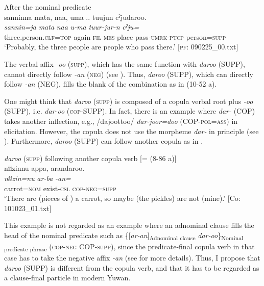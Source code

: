  \ex After the nominal predicate\\
      \glll    {\textbar}sannin{\textbar}na  mata,  naa,  uma ..  tuujun  cˀjudaroo.\\
    \textit{sannin=ja}  \textit{mata}  \textit{naa}  \textit{u-ma}  \textit{tuur-jur-n} \textit{cˀju=}\\
    three.person.\textsc{clf}=\textsc{top}  again  \textsc{fil}  \textsc{mes}-place  pass-\textsc{umrk}-\textsc{ptcp}  person=\textsc{supp}  \\
    \glt     ‘Probably, the three people are people who pass there.’   [\textsc{pf}: 090225\_00.txt]
\z
\z

The verbal affix \textit{{}-oo} (\textsc{supp}), which has the same function with \textit{daroo} (SUPP), cannot directly follow \textit{{}-an} (\textsc{neg}) (see ). Thus, \textit{daroo} (SUPP), which can directly follow \textit{-an} (NEG), fills the blank of the combination as in (10-52 a).

  One might think that \textit{daroo} (\textsc{supp}) is composed of a copula verbal root plus \textit{{}-oo} (SUPP), i.e. \textit{dar-oo} (\textsc{cop}-SUPP). In fact, there is an example where \textit{dar-} (COP) takes another inflection, e.g., /dajoottoo/ \textit{dar-joor=doo} (COP-\textsc{pol}=\textsc{ass}) in elicitation. However, the copula does not use the morpheme \textit{dar-} in principle (see ). Furthermore, \textit{daroo} (SUPP) can follow another copula as in .

\ea\label{ex:10.53}   \textit{daroo} (\textsc{supp}) following another copula verb [= (8-86 a)]\\
      \glll    nɨɨzinnu  appa,  arandaroo.\\
    \textit{nɨɨzin=nu}  \textit{ar-ba}  \textit{-an=}\\
    carrot=\textsc{nom}  exist-\textsc{csl}  \textsc{cop}-\textsc{neg}=\textsc{supp}\\
\glt     ‘There are (pieces of ) a carrot, so maybe (the pickles) are not (mine).’  [Co: 101023\_01.txt]
\z

This example is not regarded as an example where an adnominal clause fills the head of the nominal predicate such as \{[\textit{ar-an}]\textsubscript{Adnominal clause} \textit{dar-oo}\}\textsubscript{Nominal predicate phrase} (\textsc{cop}-\textsc{neg} COP-\textsc{supp}), since the predicate-final copula verb in that case has to take the negative affix \textit{-an} (see  for more details). Thus, I propose that \textit{daroo} (SUPP) is different from the copula verb, and that it has to be regarded as a clause-final particle in modern Yuwan.

